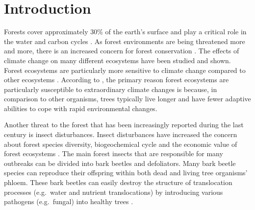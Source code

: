 \documentclass[a4paper, twoside]{templates/ociamthesis}
\begin{document}
\begin{romanpages}
\flushbottom

\tableofcontents

\listoffigures
	\mtcaddchapter

\listoftables
  \mtcaddchapter


\end{romanpages}

\flushbottom

\hypertarget{introduction}{%
\chapter{Introduction}\label{introduction}}

Forests cover approximately 30\% of the earth's surface and play a critical role in the water and carbon cycles \citep{laurent2011inversion}. As forest environments are being threatened more and more, there is an increased concern for forest conservation \citep{grammatikopoulou2021value}. The effects of climate change on many different ecosystems have been studied and shown. Forest ecosystems are particularly more sensitive to climate change compared to other ecosystems \citep{esquivel2019compositional, lindner2010climate}. According to \citet{lindner2010climate}, the primary reason forest ecosystems are particularly susceptible to extraordinary climate changes is because, in comparison to other organisms, trees typically live longer and have fewer adaptive abilities to cope with rapid environmental changes.

Another threat to the forest that has been increasingly reported during the last century is insect disturbances. Insect disturbances have increased the concern about forest species diversity, biogeochemical cycle and the economic value of forest ecosystems \citep{senf2017remote}. The main forest insects that are responsible for many outbreaks can be divided into bark beetles and defoliators. Many bark beetle species can reproduce their offspring within both dead and living tree organisms' phloem. These bark beetles can easily destroy the structure of translocation processes (e.g.~water and nutrient translocations) by introducing various pathogens (e.g.~fungal) into healthy trees \citep{senf2017remote}.
\end{document}
